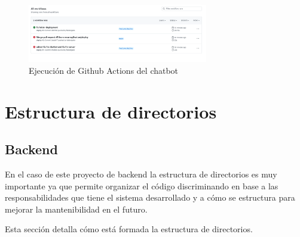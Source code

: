 \begin{figure}[h]
    \centering
    \includegraphics[width=0.7\textwidth]{img/github/ci_chatbot.png}
    \caption{Ejecución de Github Actions del chatbot} \label{Img:Github+Actions+Chatbot}
\end{figure} 

\newpage
\section{Estructura de directorios}

\subsection{Backend}
En el caso de este proyecto de backend la estructura de directorios es muy importante ya que permite organizar el código discriminando en base a las responsabilidades que tiene el sistema desarrollado y a cómo se estructura para mejorar la mantenibilidad en el futuro.

Esta sección detalla cómo está formada la estructura de directorios.

